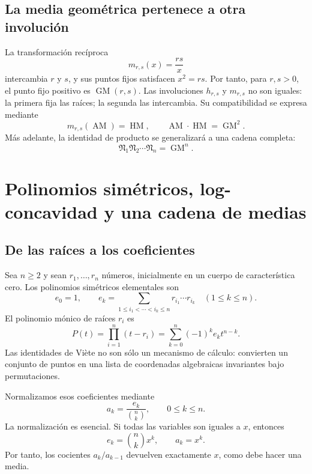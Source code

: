 \documentclass[11pt,oneside]{scrartcl}
\theoremstyle{plainblue}
\theoremstyle{definitionblue}
\theoremstyle{remarkgray}
\newcommand{\AM}{\operatorname{AM}}
\newcommand{\GM}{\operatorname{GM}}
\newcommand{\HM}{\operatorname{HM}}
\newcommand{\cN}{\mathfrak{N}}
\begin{document}
\subsection{La media geométrica pertenece a otra involución}

La transformación recíproca
\[
m_{r,s}(x)=\frac{rs}{x}
\]
intercambia \(r\) y \(s\), y sus puntos fijos satisfacen \(x^2=rs\). Por tanto,
para \(r,s>0\), el punto fijo positivo es \(\GM(r,s)\). Las involuciones
\(h_{r,s}\) y \(m_{r,s}\) no son iguales: la primera fija las raíces; la segunda las
intercambia. Su compatibilidad se expresa mediante
\[
m_{r,s}(\AM)=\HM,
\qquad
\AM\cdot\HM=\GM^2.
\]
Más adelante, la identidad de producto se generalizará a una cadena completa:
\[
\cN_1\cN_2\cdots\cN_n=\GM^n.
\]


\section{Polinomios simétricos, log-concavidad y una cadena de medias}

\subsection{De las raíces a los coeficientes}

Sea \(n\ge2\) y sean \(r_1,\dots,r_n\) números, inicialmente en un cuerpo de
característica cero. Los polinomios simétricos elementales son
\[
e_0=1,
\qquad
e_k=\sum_{1\le i_1<\cdots<i_k\le n}
 r_{i_1}\cdots r_{i_k}
\quad(1\le k\le n).
\]
El polinomio mónico de raíces \(r_i\) es
\begin{equation}\label{eq:P-viete}
P(t)=\prod_{i=1}^{n}(t-r_i)
=\sum_{k=0}^{n}(-1)^ke_k t^{n-k}.
\end{equation}
Las identidades de Viète no son sólo un mecanismo de cálculo: convierten un conjunto
de puntos en una lista de coordenadas algebraicas invariantes bajo permutaciones.

Normalizamos esos coeficientes mediante
\begin{equation}\label{eq:ak}
a_k=\frac{e_k}{\binom nk},\qquad 0\le k\le n.
\end{equation}
La normalización es esencial. Si todas las variables son iguales a \(x\), entonces
\[
e_k=\binom nk x^k,
\qquad a_k=x^k.
\]
Por tanto, los cocientes \(a_k/a_{k-1}\) devuelven exactamente \(x\), como debe
hacer una media.
\end{document}
